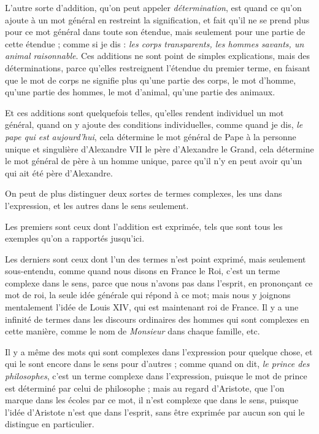 L'autre sorte d'addition, qu'on peut appeler \emph{détermination}, est quand ce qu'on ajoute à un mot général en restreint la signification, et fait qu'il ne se prend plus pour ce mot général dans toute son étendue, mais seulement pour une partie de cette étendue ; comme si je dis : \emph{les corps transparents, les hommes savants, un animal raisonnable}. Ces additions ne sont point de simples explications, mais des déterminations, parce qu'elles restreignent l'étendue du premier terme, en faisant que le mot de corps ne signifie plus qu'une partie des corps, le mot d'homme, qu'une partie des hommes, le mot d'animal, qu'une partie des animaux.

Et ces additions sont quelquefois telles, qu'elles rendent individuel un mot général, quand on y ajoute des conditions individuelles, comme quand je dis, \emph{le pape qui est aujourd'hui}, cela détermine le mot général de Pape à la personne unique et singulière d'Alexandre VII le père d'Alexandre le Grand, cela détermine le mot général de père à un homme unique, parce qu'il n'y en peut avoir qu'un qui ait été père d'Alexandre.

On peut de plus distinguer deux sortes de termes complexes, les uns dans l'expression, et les autres dans le sens seulement.

Les premiers sont ceux dont l'addition est exprimée, tels que sont tous les exemples qu'on a rapportés jusqu'ici.

Les derniers sont ceux dont l'un des termes n'est point exprimé, mais seulement sous-entendu, comme quand nous disons en France le Roi, c'est un terme complexe dans le sens, parce que nous n'avons pas dans l'esprit, en prononçant ce mot de roi, la seule idée générale qui répond à ce mot; mais nous y joignons mentalement l'idée de Louis XIV, qui est maintenant roi de France. Il y a une infinité de termes dans les discours ordinaires des hommes qui sont complexes en cette manière, comme le nom de \emph{Monsieur} dans chaque famille, etc.

Il y a même des mots qui sont complexes dans l'expression pour quelque chose, et qui le sont encore dans le sens pour d'autres ; comme quand on dit, \emph{le prince des philosophes}, c'est un terme complexe dans l'expression, puisque le mot de prince est déterminé par celui de philosophe ; mais au regard d'Aristote, que l'on marque dans les écoles par ce mot, il n'est complexe que dans le sens, puisque l'idée d'Aristote n'est que dans l'esprit, sans être exprimée par aucun son qui le distingue en particulier.

